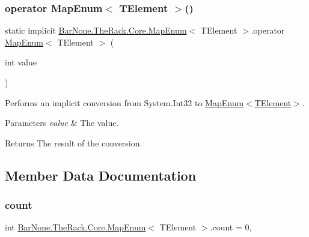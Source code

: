 \subsubsection{\texorpdfstring{operator Map\+Enum$<$ T\+Element $>$()}{operator MapEnum< TElement >()}}
{\footnotesize\ttfamily static implicit \mbox{\hyperlink{class_bar_none_1_1_the_rack_1_1_core_1_1_map_enum}{Bar\+None.\+The\+Rack.\+Core.\+Map\+Enum}}$<$ T\+Element $>$.operator \mbox{\hyperlink{class_bar_none_1_1_the_rack_1_1_core_1_1_map_enum}{Map\+Enum}}$<$ T\+Element $>$ (\begin{DoxyParamCaption}\item[{int}]{value }\end{DoxyParamCaption})\hspace{0.3cm}{\ttfamily [static]}}



Performs an implicit conversion from System.\+Int32 to \mbox{\hyperlink{class_bar_none_1_1_the_rack_1_1_core_1_1_map_enum_ae558c9ed80801b7e8180f3fc48e31e1e}{Map\+Enum$<$\+T\+Element$>$}}. 


\begin{DoxyParams}{Parameters}
{\em value} & The value.\\
\hline
\end{DoxyParams}
\begin{DoxyReturn}{Returns}
The result of the conversion. 
\end{DoxyReturn}


\subsection{Member Data Documentation}
\mbox{\label{class_bar_none_1_1_the_rack_1_1_core_1_1_map_enum_a407380e58143a85b52a2a75ad5b0f018}} 
\subsubsection{\texorpdfstring{count}{count}}
{\footnotesize\ttfamily int \mbox{\hyperlink{class_bar_none_1_1_the_rack_1_1_core_1_1_map_enum}{Bar\+None.\+The\+Rack.\+Core.\+Map\+Enum}}$<$ T\+Element $>$.count = 0\hspace{0.3cm}{\ttfamily [static]}, {\ttfamily [private]}}



